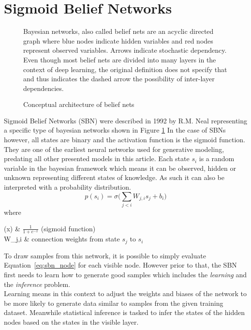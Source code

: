 \section{Sigmoid Belief Networks}
\label{sec:sbn}
\begin{figure}[htb]
\centering

  \caption[Architecture of Sigmoid Belief Nets]{Conceptual architecture of belief nets}
  \label{fig:sbn_arch}
  \medskip
  \small
  Bayesian networks, also called belief nets are an acyclic directed graph where blue nodes indicate hidden variables and red nodes represent observed variables.
  Arrows indicate stochastic dependency.
  Even though most belief nets are divided into many layers in the context of deep learning, the original definition does not specify that and thus indicates the dashed arrow the possibility of inter-layer dependencies.
\end{figure}

Sigmoid Belief Networks (SBN) were described in 1992 by R.M. Neal \cite{neal:1992} representing a specific type of bayesian networks \cite{pearl:1985} shown in Figure \ref{fig:sbn_arch}
In the case of SBNs however, all states are binary and the activation function is the sigmoid function. They are one of the earliest neural networks used for generative modeling, predating all other presented models in this article.
Each state $s_i$ is a random variable in the bayesian framework which means it can be observed, hidden or unknown representing different states of knowledge. As such it can also be interpreted with a probability distribution.
\begin{equation}
  \label{eq:sbn_node}
p(s_i) = \sigma\bigg(\sum_{j<i}W_{j,i}s_j+b_i\bigg)
\end{equation}
where 
\begin{conditions}
  \sigma(x) & $\frac{1}{1 + e^{-x}}$ (sigmoid function)\\
  W_{j,i} & connection weights from state $s_j$ to $s_i$\\
\end{conditions}

To draw samples from this network, it is possible to simply evaluate Equation~\ref{eq:sbn_node} for each visible node.
However prior to that, the SBN first needs to learn how to generate good samples which includes the \emph{learning} and the \emph{inference} problem.\\
Learning means in this context to adjust the weights and biases of the network to be more likely to generate data similar to samples from the given training dataset.
Meanwhile statistical inference is tasked to infer the states of the hidden nodes based on the states in the visible layer.\\

